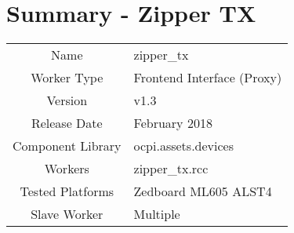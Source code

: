\documentclass{article}
\author{} %
\date{Version \docVersion} %
\title{\docTitle}
\def\docVersion{1.3}
\def\comp{zipper\_tx}
\def\Comp{Zipper TX}
\begin{document}
\section*{Summary - \Comp}
\begin{tabular}{|c|M{13.5cm}|}
	\hline
	                  &                                        \\
	\hline
	Name              & \comp                                  \\
	\hline
	Worker Type       & Frontend Interface (Proxy)             \\
	\hline
	Version           & v\docVersion \\
	\hline
	Release Date      & February 2018 \\
	\hline
	Component Library & ocpi.assets.devices \\
	\hline
	Workers           & zipper\_tx.rcc                      \\
	\hline
	Tested Platforms  & Zedboard ML605 ALST4                           \\
	\hline
	Slave Worker      & Multiple                               \\
	\hline
\end{tabular}
\end{document}
